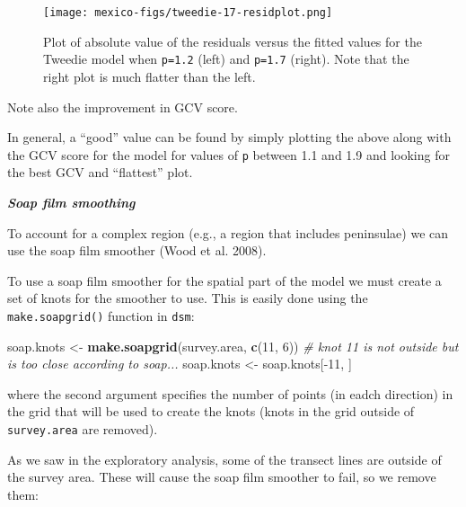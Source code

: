 \documentclass[]{article}
\newenvironment{Shaded}{}{}
\newcommand{\KeywordTok}[1]{\textcolor[rgb]{0.00,0.44,0.13}{\textbf{{#1}}}}
\newcommand{\DataTypeTok}[1]{\textcolor[rgb]{0.56,0.13,0.00}{{#1}}}
\newcommand{\DecValTok}[1]{\textcolor[rgb]{0.25,0.63,0.44}{{#1}}}
\newcommand{\StringTok}[1]{\textcolor[rgb]{0.25,0.44,0.63}{{#1}}}
\newcommand{\CommentTok}[1]{\textcolor[rgb]{0.38,0.63,0.69}{\textit{{#1}}}}
\newcommand{\NormalTok}[1]{{#1}}
\begin{document}
\begin{figure}[htbp]
\centering
\texttt{[image: mexico-figs/tweedie-17-residplot.png]}
\caption{Plot of absolute value of the residuals versus the fitted
values for the Tweedie model when \texttt{p=1.2} (left) and
\texttt{p=1.7} (right). Note that the right plot is much flatter than
the left.}
\end{figure}

Note also the improvement in GCV score.

In general, a ``good'' value can be found by simply plotting the above
along with the GCV score for the model for values of \texttt{p} between
1.1 and 1.9 and looking for the best GCV and ``flattest'' plot.

\textbf{\emph{Soap film smoothing}}

To account for a complex region (e.g., a region that includes
peninsulae) we can use the soap film smoother (Wood et al. 2008).

To use a soap film smoother for the spatial part of the model we must
create a set of knots for the smoother to use. This is easily done using
the \texttt{make.soapgrid()} function in \texttt{dsm}:

\begin{Shaded}
\begin{Highlighting}[]
\NormalTok{soap.knots <-}\StringTok{ }\KeywordTok{make.soapgrid}\NormalTok{(survey.area, }\KeywordTok{c}\NormalTok{(}\DecValTok{11}\NormalTok{, }\DecValTok{6}\NormalTok{))}
\CommentTok{# knot 11 is not outside but is too close according to soap...}
\NormalTok{soap.knots <-}\StringTok{ }\NormalTok{soap.knots[-}\DecValTok{11}\NormalTok{, ]}
\end{Highlighting}
\end{Shaded}

where the second argument specifies the number of points (in eadch
direction) in the grid that will be used to create the knots (knots in
the grid outside of \texttt{survey.area} are removed).

As we saw in the exploratory analysis, some of the transect lines are
outside of the survey area. These will cause the soap film smoother to
fail, so we remove them:

\begin{Shaded}
\end{Shaded}
\end{document}

